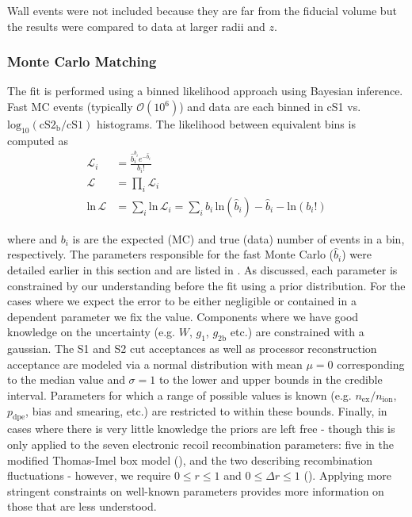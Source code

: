 Wall events were not included because they are far from the fiducial volume but the results were compared to data at larger radii and $z$.



\subsubsection{Monte Carlo Matching}
\label{subsubsec:er_nr_calibrations_parameter_determ_mc_match}
The fit is performed using a binned likelihood approach using Bayesian inference.  Fast MC events (typically $\mathcal{O}(10^6)$) and
data are each binned in cS1 vs. $\mathrm{log_{10}(cS2_b / cS1)}$ histograms.  The likelihood between equivalent bins \li is computed as
\begin{subequations}
\begin{align}
\mathcal{L}_i &=\frac{\hat{b}_{i}^{b_i} e^{-\hat{b}_{i}}}{b_{i}!} \\
\mathcal{L} &= \prod_i \mathcal{L}_i \\
\mathrm{ln}\, \mathcal{L} &= \sum_i \mathrm{ln}\, \mathcal{L}_i = \sum_i b_i\, \mathrm{ln} (\hat{b}_i) - \hat{b}_i - \mathrm{ln} (b_i !)
\end{align}
\end{subequations}

\noindent where \bhi and $b_i$ is are the expected (MC) and true (data) number of events in a bin, respectively.  The parameters
responsible for the fast Monte Carlo ($\hat{b}_i$) were detailed earlier in this section and are listed in
.  As discussed, each parameter is constrained by our understanding before
the fit using a prior distribution.  For the cases where we expect the error to be either negligible or contained in a dependent parameter
we fix the value.  Components where we have good knowledge on the uncertainty (e.g. $W$, $g_1$, $g_{2\mathrm{b}}$ etc.) are constrained
with a gaussian.  The S1 and S2 cut acceptances as well as processor reconstruction acceptance are modeled via a normal distribution with
mean $\mu = 0$ corresponding to the median value and $\sigma = 1$ to the lower and upper bounds in the credible interval.  Parameters for
which a range of possible values is known (e.g. $n_{\mathrm{ex}} / n_{\mathrm{ion}}$, $p_{\mathrm{dpe}}$,
bias and smearing, etc.) are restricted to within these bounds.  Finally, in cases where there is very little knowledge the priors
are left free - though this is only applied to the seven electronic recoil recombination parameters: five in the modified Thomas-Imel box
model (), and the two describing recombination
fluctuations - however, we require $0 \leq r \leq 1$ and $0 \leq \Delta r \leq 1$
().  Applying more stringent constraints on well-known parameters provides more
information on those that are less understood.

